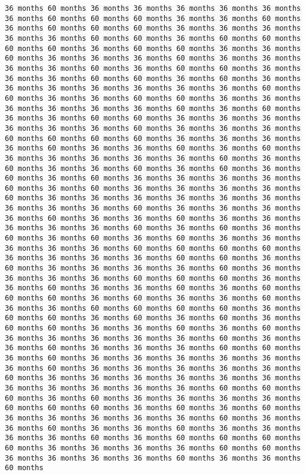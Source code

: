 \documentclass[11pt]{article}
\begin{document}
\begin{Verbatim}[commandchars=\\\{\}, frame=single, framerule=2mm, rulecolor=\color{outerrorbackground}]
36 months 60 months 36 months 36 months 36 months 36 months 36 months 36 months 60 months 60 months 60 months 36 months 36 months 60 months 36 months 60 months 60 months 60 months 36 months 36 months 36 months 36 months 36 months 60 months 60 months 36 months 60 months 60 months 60 months 60 months 36 months 60 months 60 months 36 months 36 months 60 months 36 months 36 months 36 months 60 months 36 months 36 months 36 months 36 months 60 months 36 months 60 months 60 months 36 months 36 months 36 months 60 months 60 months 36 months 60 months 36 months 36 months 36 months 36 months 36 months 36 months 36 months 60 months 60 months 36 months 36 months 60 months 60 months 36 months 36 months 36 months 36 months 36 months 36 months 60 months 36 months 60 months 36 months 36 months 60 months 60 months 36 months 36 months 36 months 36 months 36 months 36 months 60 months 36 months 36 months 36 months 60 months 60 months 60 months 60 months 36 months 36 months 36 months 36 months 60 months 36 months 36 months 60 months 36 months 60 months 36 months 36 months 36 months 36 months 36 months 60 months 36 months 60 months 36 months 36 months 60 months 36 months 60 months 36 months 60 months 36 months 60 months 36 months 36 months 36 months 36 months 60 months 36 months 60 months 36 months 36 months 36 months 36 months 60 months 36 months 36 months 36 months 36 months 36 months 36 months 36 months 36 months 36 months 60 months 36 months 36 months 36 months 36 months 60 months 36 months 36 months 60 months 36 months 36 months 36 months 36 months 36 months 60 months 36 months 60 months 36 months 60 months 36 months 60 months 36 months 60 months 36 months 36 months 36 months 36 months 36 months 60 months 60 months 60 months 60 months 36 months 36 months 36 months 36 months 60 months 60 months 36 months 60 months 36 months 36 months 36 months 36 months 60 months 36 months 36 months 36 months 36 months 60 months 60 months 60 months 36 months 36 months 60 months 36 months 36 months 60 months 36 months 60 months 60 months 60 months 36 months 60 months 36 months 36 months 60 months 36 months 36 months 60 months 60 months 60 months 60 months 36 months 60 months 60 months 36 months 60 months 36 months 60 months 36 months 60 months 60 months 36 months 36 months 60 months 36 months 60 months 36 months 36 months 36 months 36 months 36 months 60 months 36 months 36 months 60 months 36 months 36 months 36 months 60 months 60 months 36 months 60 months 36 months 36 months 36 months 36 months 36 months 36 months 60 months 36 months 36 months 36 months 36 months 36 months 60 months 36 months 36 months 36 months 36 months 36 months 36 months 36 months 36 months 36 months 36 months 36 months 60 months 60 months 60 months 36 months 60 months 36 months 36 months 36 months 36 months 60 months 60 months 60 months 36 months 60 months 36 months 60 months 36 months 36 months 36 months 36 months 36 months 60 months 36 months 36 months 60 months 36 months 36 months 60 months 36 months 36 months 36 months 36 months 60 months 36 months 60 months 60 months 60 months 60 months 36 months 36 months 36 months 36 months 60 months 60 months 36 months 36 months 36 months 36 months 60 months 36 months 36 months 60 months 
\end{Verbatim}
\end{document}
